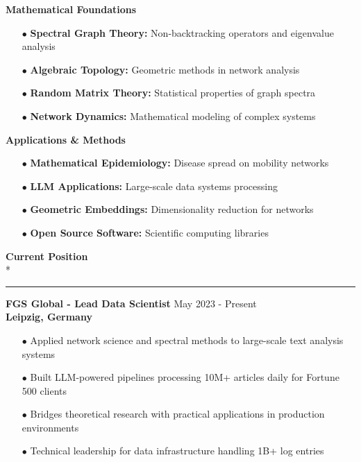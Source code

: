 \documentclass[11pt,a4paper]{article}
\newlength{\spacexs}    \setlength{\spacexs}{6pt}      %
\newlength{\spacesm}    \setlength{\spacesm}{11pt}     %
\newlength{\spacexl}    \setlength{\spacexl}{38pt}     %
\newcommand{\bodytext}[1]{%
    {\fontsize{10pt}{14pt}\selectfont\color{charcoal} #1}%
}
\newcommand{\bodytextbold}[1]{%
    {\fontsize{10pt}{14pt}\selectfont\color{charcoal}\bfseries #1}%
}
\newcommand{\microtext}[1]{%
    {\fontsize{8pt}{11pt}\selectfont\color{mediumgray} #1}%
}
\newcommand{\sectiontitle}[1]{%
    \needspace{4\baselineskip}%
    \vspace{\spacexl}%
    {\fontsize{12pt}{14pt}\selectfont\color{navy}\bfseries #1}\\*%
    \vspace{1pt}%
    {\color{plum}\rule{20pt}{1pt}}%
    \vspace{0pt}%
}
\newcommand{\plumbullet}{{\color{plum}$\bullet$}\space}
\newcommand{\jobduration}[1]{%
    {\fontspec{JetBrains Mono}\microtext{#1}}
}
\newcommand{\companyname}[1]{%
    {\color{darkgray}\bfseries #1}
}
\begin{document}
\setlength{\multicolsep}{0pt}
\begin{multicols}{2}
\raggedcolumns
\bodytextbold{Mathematical Foundations}
\vspace{2pt}
\begin{itemize}[leftmargin=15pt,itemindent=0pt,labelwidth=10pt,labelsep=5pt,itemsep=1pt,parsep=0pt,topsep=0pt,partopsep=0pt]
    \item[\plumbullet] \bodytext{\textbf{Spectral Graph Theory:} Non-backtracking operators and eigenvalue analysis}
    \item[\plumbullet] \bodytext{\textbf{Algebraic Topology:} Geometric methods in network analysis}
    \item[\plumbullet] \bodytext{\textbf{Random Matrix Theory:} Statistical properties of graph spectra}
    \item[\plumbullet] \bodytext{\textbf{Network Dynamics:} Mathematical modeling of complex systems}
\end{itemize}

\columnbreak

\bodytextbold{Applications \& Methods}
\vspace{2pt}
\begin{itemize}[leftmargin=15pt,itemindent=0pt,labelwidth=10pt,labelsep=5pt,itemsep=1pt,parsep=0pt,topsep=0pt,partopsep=0pt]
    \item[\plumbullet] \bodytext{\textbf{Mathematical Epidemiology:} Disease spread on mobility networks}
    \item[\plumbullet] \bodytext{\textbf{LLM Applications:} Large-scale data systems processing}
    \item[\plumbullet] \bodytext{\textbf{Geometric Embeddings:} Dimensionality reduction for networks}
    \item[\plumbullet] \bodytext{\textbf{Open Source Software:} Scientific computing libraries}
\end{itemize}
\end{multicols}

\sectiontitle{Current Position}
\vspace{\spacesm}

\bodytext{\textbf{FGS Global - Lead Data Scientist}} \hfill \jobduration{May 2023 - Present}\\
\companyname{Leipzig, Germany}

\vspace{\spacexs}
\begin{itemize}[leftmargin=15pt,itemindent=0pt,labelwidth=10pt,labelsep=5pt,itemsep=2pt,parsep=0pt,topsep=0pt,partopsep=0pt]
    \item[\plumbullet] \bodytext{Applied network science and spectral methods to large-scale text analysis systems}
    \item[\plumbullet] \bodytext{Built LLM-powered pipelines processing 10M+ articles daily for Fortune 500 clients}
    \item[\plumbullet] \bodytext{Bridges theoretical research with practical applications in production environments}
    \item[\plumbullet] \bodytext{Technical leadership for data infrastructure handling 1B+ log entries}
\end{itemize}
\end{document}
